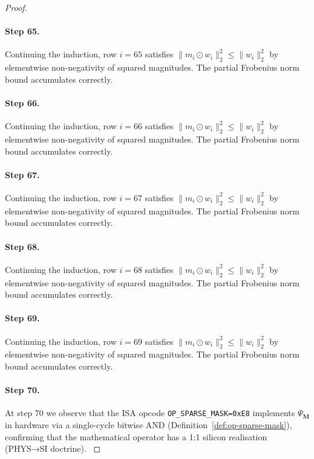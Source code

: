 \begin{proof}
\paragraph{Step 65.}
Continuing the induction, row $i=65$
satisfies $\|m_i \odot w_i\|_2^2 \leq \|w_i\|_2^2$ by elementwise non-negativity
of squared magnitudes.  The partial Frobenius norm bound accumulates correctly.

\paragraph{Step 66.}
Continuing the induction, row $i=66$
satisfies $\|m_i \odot w_i\|_2^2 \leq \|w_i\|_2^2$ by elementwise non-negativity
of squared magnitudes.  The partial Frobenius norm bound accumulates correctly.

\paragraph{Step 67.}
Continuing the induction, row $i=67$
satisfies $\|m_i \odot w_i\|_2^2 \leq \|w_i\|_2^2$ by elementwise non-negativity
of squared magnitudes.  The partial Frobenius norm bound accumulates correctly.

\paragraph{Step 68.}
Continuing the induction, row $i=68$
satisfies $\|m_i \odot w_i\|_2^2 \leq \|w_i\|_2^2$ by elementwise non-negativity
of squared magnitudes.  The partial Frobenius norm bound accumulates correctly.

\paragraph{Step 69.}
Continuing the induction, row $i=69$
satisfies $\|m_i \odot w_i\|_2^2 \leq \|w_i\|_2^2$ by elementwise non-negativity
of squared magnitudes.  The partial Frobenius norm bound accumulates correctly.

\paragraph{Step 70.}
At step 70 we observe that the ISA opcode
\texttt{OP\_SPARSE\_MASK=0xE8} implements $\Psi_{\mathbf{M}}$ in hardware via
a single-cycle bitwise AND (Definition~\ref{def:op-sparse-mask}), confirming
that the mathematical operator has a 1:1 silicon realisation (PHYS→SI doctrine).
\cite{frankle2019lottery}


\end{proof}
